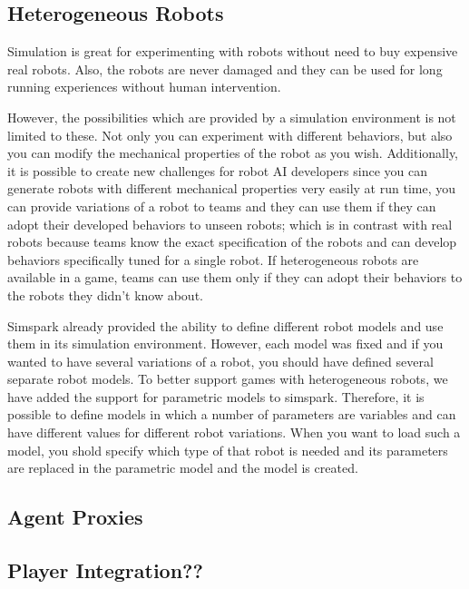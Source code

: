 \documentclass{llncs}
\begin{document}
\subsection{Heterogeneous Robots}
Simulation is great for experimenting with robots without need to buy expensive 
real robots. Also, the robots are never damaged and they can be used for long 
running experiences without human intervention. 

However, the possibilities which are provided by a simulation environment is 
not limited to these. Not only you can experiment with different behaviors, but
also you can modify the mechanical properties of the robot as you wish. Additionally,
it is possible to create new challenges for robot AI developers since you can
generate robots with different mechanical properties very easily at run time, 
you can provide variations of a robot to teams and they can use them if they can
adopt their developed behaviors to unseen robots; which is in contrast with 
real robots because teams know the exact specification of the robots and
can develop behaviors specifically tuned for a single robot. If heterogeneous 
robots are available in a game, teams can use them only if they can adopt
their behaviors to the robots they didn't know about.

Simspark already provided the ability to define different robot models and 
use them in its simulation environment. However, each model was fixed and if you
wanted to have several variations of a robot, you should have defined several 
separate robot models. To better support games with heterogeneous robots, we have
added the support for parametric models to simspark. Therefore, it is possible to
define models in which a number of parameters are variables and can have different
values for different robot variations. When you want to load such a model, you shold 
specify which type of that robot is needed and its parameters are replaced in the
parametric model and the model is created. 

\subsection{Agent Proxies}

\subsection{Player Integration??}
\end{document}
